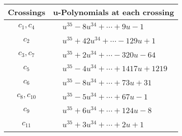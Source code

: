 \documentclass[1p]{elsarticle_modified}
\theoremstyle{definition}
\begin{document}
\begin{tabular}{m{50pt}|m{274pt}}
Crossings & \hspace{64pt}u-Polynomials at each crossing \\
\hline $$\begin{aligned}c_{1},c_{4}\end{aligned}$$&$\begin{aligned}
&u^{35}-8 u^{34}+\cdots+9 u-1
\end{aligned}$\\
\hline $$\begin{aligned}c_{2}\end{aligned}$$&$\begin{aligned}
&u^{35}+42 u^{34}+\cdots-129 u+1
\end{aligned}$\\
\hline $$\begin{aligned}c_{3},c_{7}\end{aligned}$$&$\begin{aligned}
&u^{35}+2 u^{34}+\cdots-320 u-64
\end{aligned}$\\
\hline $$\begin{aligned}c_{5}\end{aligned}$$&$\begin{aligned}
&u^{35}-4 u^{34}+\cdots+1417 u+1219
\end{aligned}$\\
\hline $$\begin{aligned}c_{6}\end{aligned}$$&$\begin{aligned}
&u^{35}-8 u^{34}+\cdots+73 u+31
\end{aligned}$\\
\hline $$\begin{aligned}c_{8},c_{10}\end{aligned}$$&$\begin{aligned}
&u^{35}-5 u^{34}+\cdots+67 u-1
\end{aligned}$\\
\hline $$\begin{aligned}c_{9}\end{aligned}$$&$\begin{aligned}
&u^{35}+6 u^{34}+\cdots+124 u-8
\end{aligned}$\\
\hline $$\begin{aligned}c_{11}\end{aligned}$$&$\begin{aligned}
&u^{35}+3 u^{34}+\cdots+2 u+1
\end{aligned}$\\
\hline
\end{tabular}\\~\\
\end{document}
